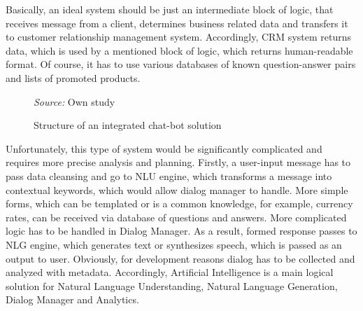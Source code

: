 Basically, an ideal system should be just an intermediate block of logic, that receives message from a client, determines business related data and transfers it to customer relationship management system.
Accordingly, CRM system returns data, which is used by a mentioned block of logic, which returns human-readable format.
Of course, it has to use various databases of known question-answer pairs and lists of promoted products.

\begin{figure}
    \centering
    \caption{Structure of an integrated chat-bot solution}
    \medskip
    \footnotesize\textit{Source:} Own study
\end{figure}    

Unfortunately, this type of system would be significantly complicated and requires more precise analysis and planning.
Firstly, a user-input message has to pass data cleansing and go to NLU engine, which transforms a message into contextual keywords, which would allow dialog manager to handle.
More simple forms, which can be templated or is a common knowledge, for example, currency rates, can be received via database of questions and answers.
More complicated logic has to be handled in Dialog Manager.
As a result, formed response passes to NLG engine, which generates text or synthesizes speech, which is passed as an output to user.
Obviously, for development reasons dialog has to be collected and analyzed with metadata. 
Accordingly, Artificial Intelligence is a main logical solution for Natural Language Understanding, Natural Language Generation, Dialog Manager and Analytics.

